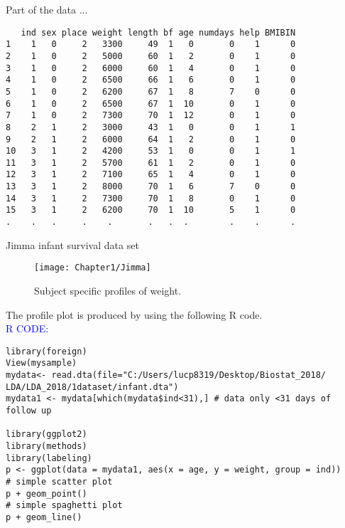 \documentclass{beamer}
\begin{document}
\begin{frame}[fragile]
Part of the data ...
\begin{verbatim}
   ind sex place weight length bf age numdays help BMIBIN
1    1   0     2   3300     49  1   0       0    1      0
2    1   0     2   5000     60  1   2       0    1      0
3    1   0     2   6000     60  1   4       0    1      0
4    1   0     2   6500     66  1   6       0    1      0
5    1   0     2   6200     67  1   8       7    0      0
6    1   0     2   6500     67  1  10       0    1      0
7    1   0     2   7300     70  1  12       0    1      0
8    2   1     2   3000     43  1   0       0    1      1
9    2   1     2   6000     64  1   2       0    1      0
10   3   1     2   4200     53  1   0       0    1      1
11   3   1     2   5700     61  1   2       0    1      0
12   3   1     2   7100     65  1   4       0    1      0
13   3   1     2   8000     70  1   6       7    0      0
14   3   1     2   7300     70  1   8       0    1      0
15   3   1     2   6200     70  1  10       5    1      0
.    .   .     .    .       .   .  .        .    .      .

\end{verbatim}
\end{frame}

\begin{frame}{Jimma infant survival data set}
\begin{figure}[h!]
	\centering
	\texttt{[image: Chapter1/Jimma]}
	\caption{Subject specific profiles of weight. \label{Jmma infant weight}}
\end{figure}
\end{frame}

\begin{frame}[fragile]
The profile plot is produced by using the following R code. \\
\vspace{1cm}
\textcolor{blue}{R CODE:} \scriptsize\begin{verbatim}
library(foreign)
View(mysample)
mydata<- read.dta(file="C:/Users/lucp8319/Desktop/Biostat_2018/
LDA/LDA_2018/1dataset/infant.dta")
mydata1 <- mydata[which(mydata$ind<31),] # data only <31 days of follow up

library(ggplot2)
library(methods)
library(labeling)
p <- ggplot(data = mydata1, aes(x = age, y = weight, group = ind))
# simple scatter plot
p + geom_point()
# simple spaghetti plot
p + geom_line()
\end{verbatim}
\end{frame}
\end{document}
